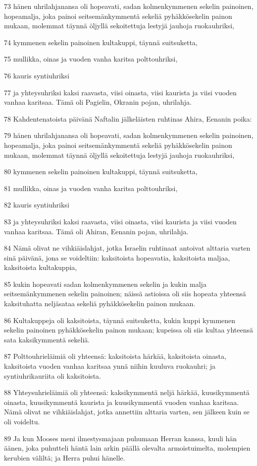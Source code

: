 \par 73 hänen uhrilahjanansa oli hopeavati, sadan kolmenkymmenen sekelin painoinen, hopeamalja, joka painoi seitsemänkymmentä sekeliä pyhäkkösekelin painon mukaan, molemmat täynnä öljyllä sekoitettuja lestyjä jauhoja ruokauhriksi,
\par 74 kymmenen sekelin painoinen kultakuppi, täynnä suitsuketta,
\par 75 mullikka, oinas ja vuoden vanha karitsa polttouhriksi,
\par 76 kauris syntiuhriksi
\par 77 ja yhteysuhriksi kaksi raavasta, viisi oinasta, viisi kaurista ja viisi vuoden vanhaa karitsaa. Tämä oli Pagielin, Okranin pojan, uhrilahja.
\par 78 Kahdentenatoista päivänä Naftalin jälkeläisten ruhtinas Ahira, Eenanin poika:
\par 79 hänen uhrilahjanansa oli hopeavati, sadan kolmenkymmenen sekelin painoinen, hopeamalja, joka painoi seitsemänkymmentä sekeliä pyhäkkösekelin painon mukaan, molemmat täynnä öljyllä sekoitettuja lestyjä jauhoja ruokauhriksi,
\par 80 kymmenen sekelin painoinen kultakuppi, täynnä suitsuketta,
\par 81 mullikka, oinas ja vuoden vanha karitsa polttouhriksi,
\par 82 kauris syntiuhriksi
\par 83 ja yhteysuhriksi kaksi raavasta, viisi oinasta, viisi kaurista ja viisi vuoden vanhaa karitsaa. Tämä oli Ahiran, Eenanin pojan, uhrilahja.
\par 84 Nämä olivat ne vihkiäislahjat, jotka Israelin ruhtinaat antoivat alttaria varten sinä päivänä, jona se voideltiin: kaksitoista hopeavatia, kaksitoista maljaa, kaksitoista kultakuppia,
\par 85 kukin hopeavati sadan kolmenkymmenen sekelin ja kukin malja seitsemänkymmenen sekelin painoinen; näissä astioissa oli siis hopeata yhteensä kaksituhatta neljäsataa sekeliä pyhäkkösekelin painon mukaan.
\par 86 Kultakuppeja oli kaksitoista, täynnä suitsuketta, kukin kuppi kymmenen sekelin painoinen pyhäkkösekelin painon mukaan; kupeissa oli siis kultaa yhteensä sata kaksikymmentä sekeliä.
\par 87 Polttouhrieläimiä oli yhteensä: kaksitoista härkää, kaksitoista oinasta, kaksitoista vuoden vanhaa karitsaa ynnä niihin kuuluva ruokauhri; ja syntiuhrikauriita oli kaksitoista.
\par 88 Yhteysuhrieläimiä oli yhteensä: kaksikymmentä neljä härkää, kuusikymmentä oinasta, kuusikymmentä kaurista ja kuusikymmentä vuoden vanhaa karitsaa. Nämä olivat ne vihkiäislahjat, jotka annettiin alttaria varten, sen jälkeen kuin se oli voideltu.
\par 89 Ja kun Mooses meni ilmestysmajaan puhumaan Herran kanssa, kuuli hän äänen, joka puhutteli häntä lain arkin päällä olevalta armoistuimelta, molempien kerubien väliltä; ja Herra puhui hänelle.

